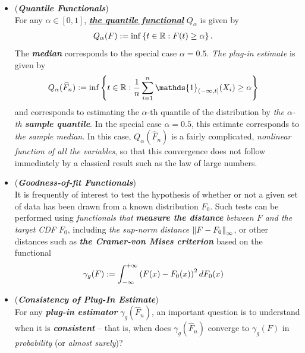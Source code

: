 \documentclass[11pt]{article}
\begin{document}
\begin{itemize}
\item \begin{example} (\textbf{\emph{Quantile Functionals}}) \\
For any $\alpha \in [0, 1]$, \underline{\textbf{\emph{the quantile functional}}} $Q_{\alpha}$ is given by
\begin{align}
Q_{\alpha}(F) &:= \inf\left\{t \in {\mathbb R}: F(t) \ge \alpha\right\}. \label{def: quantile_functional}
\end{align} The \emph{\textbf{median}} corresponds to the special case  $\alpha= 0.5$. \emph{The plug-in estimate} is given by
\begin{align}
Q_{\alpha}(\widehat{F}_n) &:= \inf\set{t \in \bR: \frac{1}{n}\sum^{n}_{i=1}\mathds{1}_{(-\infty, t]}(X_i) \ge \alpha}  \label{def: quantile_functional_estimate}
\end{align} and corresponds to estimating the $\alpha$-th quantile of the distribution by \emph{the $\alpha$-th \textbf{sample quantile}}. In the special case $\alpha= 0.5$, this estimate corresponds to \emph{the sample median}.  In this case, $Q_{\alpha}(\widehat{F}_n)$ is a fairly complicated, \emph{nonlinear function of all the
variables}, so that this convergence does not follow immediately by a classical result such as the law of large numbers.
\end{example}

\item \begin{example}(\emph{\textbf{Goodness-of-fit Functionals}})\\
It is frequently of interest to test the hypothesis of whether or not a given set of data has been drawn from a known distribution $F_0$. Such tests can
be performed using \emph{functionals that \textbf{measure the distance} between $F$ and the target CDF $F_0$}, including \emph{the sup-norm distance} $\left\|F - F_0\right\|_{\infty}$, or other distances such as \emph{\textbf{the Cramer-von Mises criterion}} based on the functional 
\begin{align*}
\gamma_{g}(F) &:= \int_{-\infty}^{+\infty} \left(F(x) - F_0(x)\right)^2 dF_0(x)
\end{align*}
\end{example}

\item \begin{remark} (\emph{\textbf{Consistency of Plug-In Estimate}})\\
For any \emph{\textbf{plug-in estimator}} $\gamma_g(\widehat{F}_n)$, an important question is to understand when it is \emph{\textbf{consistent}} -- that is, when does $\gamma_g(\widehat{F}_n)$ converge to $\gamma_{g}(F)$ in \emph{probability} (or \emph{almost surely})?


\end{remark}
\end{itemize}
\end{document}
